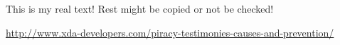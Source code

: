 This is my real text! Rest might be copied or not be checked!


\url{http://www.xda-developers.com/piracy-testimonies-causes-and-prevention/}
